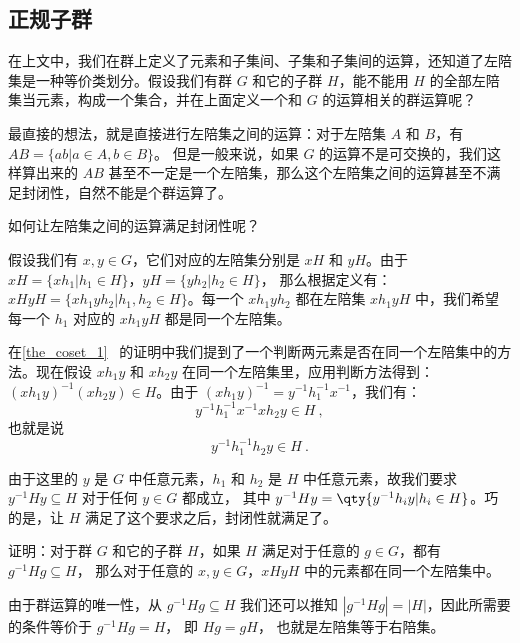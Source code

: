 

\subsection{正规子群}

在上文中，我们在群上定义了元素和子集间、子集和子集间的运算，还知道了左陪集是一种等价类划分。假设我们有群 $G$ 和它的子群 $H$，能不能用 $H$ 的全部左陪集当元素，构成一个集合，并在上面定义一个和 $G$ 的运算相关的群运算呢？

最直接的想法，就是直接进行左陪集之间的运算：对于左陪集 $A$ 和 $B$，有 $AB=\{ab|a\in A, b\in B\}$。 但是一般来说，如果 $G$ 的运算不是可交换的，我们这样算出来的 $AB$ 甚至不一定是一个左陪集，那么这个左陪集之间的运算甚至不满足封闭性，自然不能是个群运算了。

如何让左陪集之间的运算满足封闭性呢？

假设我们有 $x, y\in G$，它们对应的左陪集分别是 $xH$ 和 $yH$。由于 $xH=\{xh_1|h_1\in H\}$，$yH=\{yh_2|h_2\in H\}$， 那么根据定义有：$xHyH=\{xh_1yh_2|h_1, h_2\in H\}$。每一个 $xh_1yh_2$ 都在左陪集 $xh_1yH$ 中，我们希望每一个 $h_1$ 对应的 $xh_1yH$ 都是同一个左陪集。

在\autoref{the_coset_1}~ 的证明中我们提到了一个判断两元素是否在同一个左陪集中的方法。现在假设 $xh_1y$ 和 $xh_2y$ 在同一个左陪集里，应用判断方法得到：$(xh_1y)^{-1}(xh_2y)\in H$。由于 $(xh_1y)^{-1}=y^{-1}h_1^{-1}x^{-1}$，我们有：
\begin{equation}
y^{-1}h_1^{-1}x^{-1}xh_2y\in H~,
\end{equation}
也就是说
\begin{equation}
y^{-1}h^{-1}_1h_2y\in H~.
\end{equation}

由于这里的 $y$ 是 $G$ 中任意元素，$h_1$ 和 $h_2$ 是 $H$ 中任意元素，故我们要求 $y^{-1}Hy\subseteq H$ 对于任何 $y\in G$ 都成立， 其中 $y^{-1}Hy = \qty{y^{-1}h_i y|h_i \in H}$。巧的是，让 $H$ 满足了这个要求之后，封闭性就满足了。

\begin{exercise}{}\label{exe_NormSG_1}
证明：对于群 $G$ 和它的子群 $H$，如果 $H$ 满足对于任意的 $g\in G$，都有 $g^{-1}Hg\subseteq H$， 那么对于任意的 $x, y\in G$，$xHyH$ 中的元素都在同一个左陪集中。
\end{exercise}

\begin{corollary}{}\label{cor_NormSG_1}
由于群运算的唯一性，从 $g^{-1}Hg\subseteq H$ 我们还可以推知 $|g^{-1}Hg|=|H|$，因此所需要的条件等价于 $g^{-1}Hg=H$， 即 $Hg = gH$， 也就是左陪集等于右陪集。
\end{corollary}

